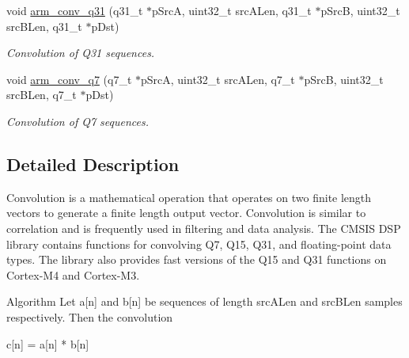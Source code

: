 \begin{DoxyCompactItemize}
void \hyperlink{group___conv_ga946b58da734f1e4e78c91fcaab4b12b6}{arm\-\_\-conv\-\_\-q31} (q31\-\_\-t $\ast$p\-Src\-A, uint32\-\_\-t src\-A\-Len, q31\-\_\-t $\ast$p\-Src\-B, uint32\-\_\-t src\-B\-Len, q31\-\_\-t $\ast$p\-Dst)
\begin{DoxyCompactList}\small\item\em Convolution of Q31 sequences. \end{DoxyCompactList}\item 
void \hyperlink{group___conv_gae2070cb792a167e78dbad8d06b97cdab}{arm\-\_\-conv\-\_\-q7} (q7\-\_\-t $\ast$p\-Src\-A, uint32\-\_\-t src\-A\-Len, q7\-\_\-t $\ast$p\-Src\-B, uint32\-\_\-t src\-B\-Len, q7\-\_\-t $\ast$p\-Dst)
\begin{DoxyCompactList}\small\item\em Convolution of Q7 sequences. \end{DoxyCompactList}\end{DoxyCompactItemize}


\subsection{Detailed Description}
Convolution is a mathematical operation that operates on two finite length vectors to generate a finite length output vector. Convolution is similar to correlation and is frequently used in filtering and data analysis. The C\-M\-S\-I\-S D\-S\-P library contains functions for convolving Q7, Q15, Q31, and floating-\/point data types. The library also provides fast versions of the Q15 and Q31 functions on Cortex-\/\-M4 and Cortex-\/\-M3.

\begin{DoxyParagraph}{Algorithm }
Let {\ttfamily a\mbox{[}n\mbox{]}} and {\ttfamily b\mbox{[}n\mbox{]}} be sequences of length {\ttfamily src\-A\-Len} and {\ttfamily src\-B\-Len} samples respectively. Then the convolution
\end{DoxyParagraph}

\begin{DoxyPre}   
                  c[n] = a[n] * b[n]   
\end{DoxyPre}



